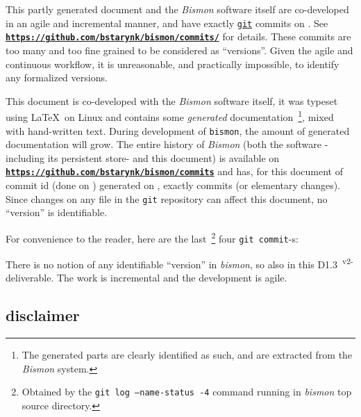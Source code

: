 \documentclass[11pt,a4paper,svgnames]{article}
\newcommand{\bmurl}[1]{{\href{#1}{\texttt{\textbf{#1}}}}}
\begin{document}
\begin{titlepage}
This partly generated document and the \emph{Bismon} software itself
are co-developed in an agile and incremental manner, and have exactly {\bmgitnumbercommits} \href{http://git-scm.com/}{\texttt{git}}
commits on \textit{\bmdoctimestamp}. See
\bmurl{https://github.com/bstarynk/bismon/commits/} for details. These commits are too many and too fine grained to be considered as ``versions''. Given the agile and continuous workflow, it is unreasonable, and practically impossible, to identify any formalized versions.

\begin{relsize}{-0.5}
This document is co-developed with the \emph{Bismon} software itself,
it was typeset using \LaTeX~on Linux and contains some \emph{generated}
documentation~\footnote{The generated parts are clearly identified as
  such, and are extracted from the \emph{Bismon} system.}, mixed with
hand-written text. During development of \texttt{bismon}, the amount
of generated documentation will grow.  The entire history of
\emph{Bismon} (both the software -including its persistent store- and
this document) is available on
\bmurl{https://github.com/bstarynk/bismon/commits} and has, for this
document of commit id \texttt{\bmgitcommit} (done on \emph{\bmgitdate}) generated on
\textit{\bmdocdate}, exactly {\bmgitnumbercommits} commits (or
elementary changes). Since changes on any file in the \texttt{git}
repository can affect this document, no ``version'' is identifiable.
\end{relsize}
\bigskip

For convenience to the reader, here are the last~\footnote{Obtained by the
  \texttt{git log --name-status -4} command running in \emph{bismon}
  top source directory.} four \texttt{git commit}-s:

\begin{relsize}{-2}
  
\end{relsize}

There is no notion of any identifiable ``version'' in \emph{bismon}, so
also in this D1.3~\textsuperscript{v2-} deliverable. The work is incremental and the
development is agile.

\bigskip

\subsection*{disclaimer}

\begin{center}
\end{center}
\end{titlepage}
\end{document}
